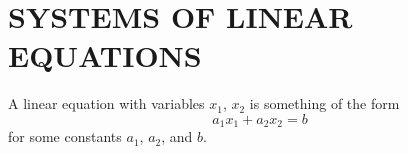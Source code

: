 \section{SYSTEMS OF LINEAR EQUATIONS}

A linear equation with variables $x_1$, $x_2$ is something of the form
$$
a_1x_1+a_2x_2=b
$$
for some constants $a_1$, $a_2$, and $b$.

